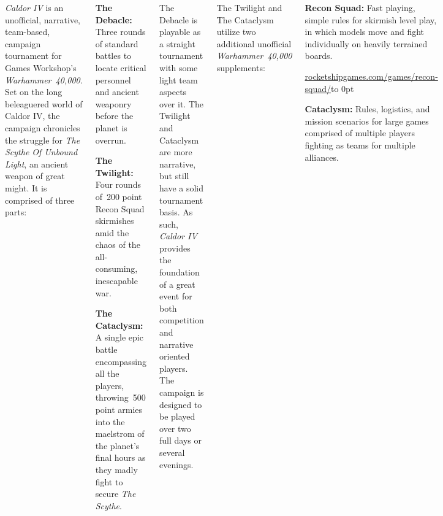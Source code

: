 \clearpage
{}

\begin{columns}
  

  \emph{Caldor IV} is an unofficial, narrative, team-based, campaign
  tournament for Games Workshop's \emph{Warhammer~40,000}.  Set on the
  long beleaguered world of Caldor IV, the campaign chronicles the
  struggle for \emph{The Scythe Of Unbound Light}, an ancient weapon
  of great might.  It is comprised of three parts:

\begin{squishitemize}
\item \textbf{The Debacle:} Three rounds of standard battles to locate
  critical personnel and ancient weaponry before the planet is
  overrun.

\item \textbf{The Twilight:} Four rounds of~200 point Recon Squad
  skirmishes amid the chaos of the all-consuming, inescapable war.

\item \textbf{The Cataclysm:} A single epic battle encompassing all
  the players, throwing~500 point armies into the maelstrom of the
  planet's final hours as they madly fight to secure \emph{The
    Scythe}.
\end{squishitemize}

The Debacle is playable as a straight tournament with some light team
aspects over it.  The Twilight and Cataclysm are more narrative, but
still have a solid tournament basis.  As such, \emph{Caldor IV}
provides the foundation of a great event for both competition and
narrative oriented players.  The campaign is designed to be played
over two full days or several evenings.

The Twilight and The Cataclysm utilize two additional unofficial
\emph{Warhammer~40,000} supplements:

\begin{squishitemize}
\item \textbf{Recon Squad:} Fast playing, simple rules for skirmish
  level play, in which models move and fight
  individually on heavily terrained boards.

\hfill\url{rocketshipgames.com/games/recon-squad/}\hfill\hbox to 0pt{}

\item \textbf{Cataclysm:} Rules, logistics, and mission scenarios for
  large games comprised of multiple players fighting as teams for
  multiple alliances.


\end{squishitemize}
\end{columns}
